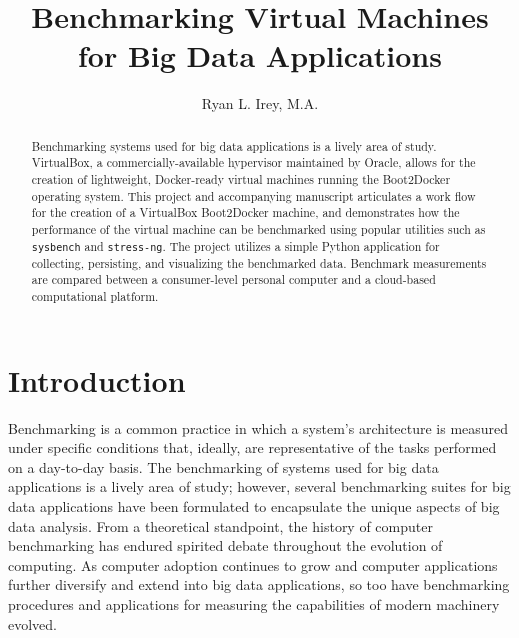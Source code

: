 \documentclass[sigconf]{acmart}
\begin{document}
\title{Benchmarking Virtual Machines for Big Data Applications}

\author{Ryan L. Irey, M.A.}

\renewcommand{\shortauthors}{R. Irey}

\begin{abstract}

Benchmarking systems used for big data applications is a lively area of study. VirtualBox, a commercially-available hypervisor maintained by Oracle, allows for the creation of lightweight, Docker-ready virtual machines running the Boot2Docker operating system. This project and accompanying manuscript articulates a work flow for the creation of a VirtualBox Boot2Docker machine, and demonstrates how the performance of the virtual machine can be benchmarked using popular utilities such as {\tt sysbench} and {\tt stress-ng}. The project utilizes a simple Python application for collecting, persisting, and visualizing the benchmarked data. Benchmark measurements are compared between a consumer-level personal computer and a cloud-based computational platform.

\end{abstract}


\maketitle

\section{Introduction}

Benchmarking is a common practice in which a system's architecture is measured under specific conditions that, ideally, are representative of the tasks performed on a day-to-day basis. The benchmarking of systems used for big data applications is a lively area of study; however, several benchmarking suites for big data applications have been formulated to encapsulate the unique aspects of big data analysis. From a theoretical standpoint, the history of computer benchmarking has endured spirited debate throughout the evolution of computing. As computer adoption continues to grow and computer applications further diversify and extend into big data applications, so too have benchmarking procedures and applications for measuring the capabilities of modern machinery evolved.
\end{document}
